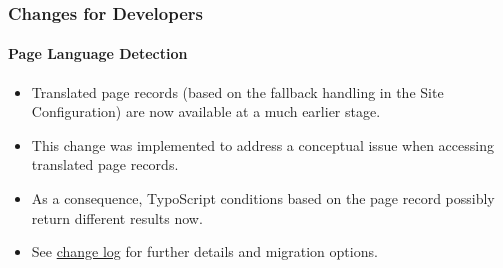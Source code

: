 %

\begin{frame}[fragile]
	\frametitle{Changes for Developers}
	\framesubtitle{Page Language Detection}


	\begin{itemize}
		\item Translated page records (based on the fallback handling in the Site
			Configuration) are now available at a much earlier stage.
		\item This change was implemented to address a conceptual issue when
			accessing translated page records.
		\item As a consequence, TypoScript conditions based on the page record
			possibly return different results now.
		\item See \href{https://docs.typo3.org/c/typo3/cms-core/master/en-us/Changelog/11.0/Breaking-23736-PageLanguageDetectionSetEarlierInFrontendRequestProcess.html}{change log}
			for further details and migration options.
	\end{itemize}

\end{frame}

